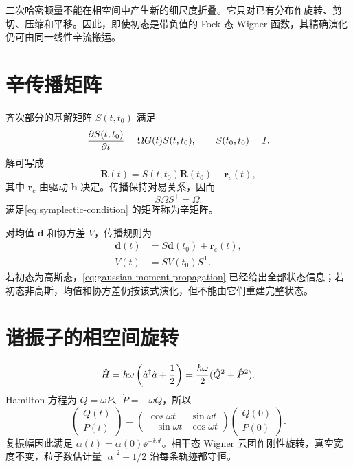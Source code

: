 \begin{intuitionbox}
二次哈密顿量不能在相空间中产生新的细尺度折叠。它只对已有分布作旋转、剪切、压缩和平移。因此，即使初态是带负值的 Fock 态 Wigner 函数，其精确演化仍可由同一线性辛流搬运。
\end{intuitionbox}

\section{辛传播矩阵}

齐次部分的基解矩阵 $S(t,t_0)$ 满足
\begin{equation}
  \frac{\partial S(t,t_0)}{\partial t}=\Omega G(t)S(t,t_0),
  \qquad S(t_0,t_0)=I.
\end{equation}
解可写成
\begin{equation}
  \bm R(t)=S(t,t_0)\bm R(t_0)+\bm r_c(t),
  \label{eq:affine-symplectic-flow}
\end{equation}
其中 $\bm r_c$ 由驱动 $\bm h$ 决定。传播保持对易关系，因而
\begin{equation}
  S\Omega S^{\mathsf T}=\Omega.
  \label{eq:symplectic-condition}
\end{equation}
满足\cref{eq:symplectic-condition} 的矩阵称为辛矩阵。

对均值 $\bm d$ 和协方差 $V$，传播规则为
\begin{align}
  \bm d(t)&=S\bm d(t_0)+\bm r_c(t),\\
  V(t)&=SV(t_0)S^{\mathsf T}.
  \label{eq:gaussian-moment-propagation}
\end{align}
若初态为高斯态，\cref{eq:gaussian-moment-propagation} 已经给出全部状态信息；若初态非高斯，均值和协方差仍按该式演化，但不能由它们重建完整状态。

\section{谐振子的相空间旋转}

\begin{equation}
  \hat H=\hbar\omega\left(\hat a^{\dagger}\hat a+\frac12\right)
  =\frac{\hbar\omega}{2}(\hat Q^2+\hat P^2).
\end{equation}
Hamilton 方程为 $\dot Q=\omega P$、$\dot P=-\omega Q$，所以
\begin{equation}
  \begin{pmatrix}Q(t)\\P(t)\end{pmatrix}
  =
  \begin{pmatrix}
    \cos\omega t&\sin\omega t\\
    -\sin\omega t&\cos\omega t
  \end{pmatrix}
  \begin{pmatrix}Q(0)\\P(0)\end{pmatrix}.
  \label{eq:harmonic-symplectic-rotation}
\end{equation}
复振幅因此满足 $\alpha(t)=\alpha(0)\ee^{-\ii\omega t}$。相干态 Wigner 云团作刚性旋转，真空宽度不变，粒子数估计量 $|\alpha|^2-1/2$ 沿每条轨迹都守恒。

